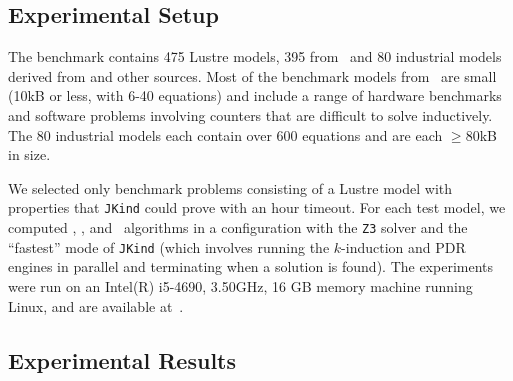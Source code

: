 \subsection{Experimental Setup}
The benchmark contains 475 Lustre models, 395 from~\cite{Hagen08:FMCAD} and 80 industrial models derived from \cite{hilt2013} and other sources.  Most of the benchmark models from~\cite{Hagen08:FMCAD} are small (10kB or less, with 6-40 equations) and include a range of hardware benchmarks and software problems involving counters that are difficult to solve inductively.
The 80 industrial models each contain over 600 equations and are each $\geq$80kB in size.

We selected only benchmark problems consisting of a Lustre model with
properties that \texttt{JKind} could prove with an hour timeout.
For each test model, we computed \aivcalg, \ucalg, and \ucbfalg ~algorithms in a configuration with the \texttt{Z3} solver and the ``fastest'' mode of \texttt{JKind} (which involves running the $k$-induction and PDR engines in parallel and terminating when a solution is found). The experiments were run on an  Intel(R) i5-4690, 3.50GHz, 16 GB memory machine running Linux, and are available at~\cite{expr}.%



\subsection{Experimental Results}

 